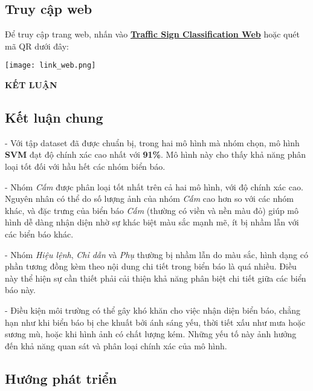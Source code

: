 \documentclass[a4paper,12pt]{article}
\begin{document}
\subsection{Truy cập web}
\hspace{5mm}Để truy cập trang web, nhấn vào \href{https://traffic-sign-classification-through-images.streamlit.app/}{\textbf{Traffic Sign Classification Web}} hoặc quét mã QR dưới đây:
\begin{center}
    \texttt{[image: link\_web.png]}
\end{center}

\newpage
{}
\thispagestyle{empty}
\begin{center}
    \textbf{\large KẾT LUẬN}
\end{center}
\vspace{1cm}
\subsection*{Kết luận chung}

\hspace{6mm}- Với tập dataset đã được chuẩn bị, trong hai mô hình mà nhóm chọn, mô hình \textbf{SVM} đạt độ chính xác cao nhất với \textbf{91\%}. Mô hình này cho thấy khả năng phân loại tốt đối với hầu hết các nhóm biển báo. 

- Nhóm \textit{Cấm} được phân loại tốt nhất trên cả hai mô hình, với độ chính xác cao. Nguyên nhân có thể do số lượng ảnh của nhóm \textit{Cấm} cao hơn so với các nhóm khác, và đặc trưng của biển báo \textit{Cấm} (thường có viền và nền màu đỏ) giúp mô hình dễ dàng nhận diện nhờ sự khác biệt màu sắc mạnh mẽ, ít bị nhầm lẫn với các biển báo khác.
  
- Nhóm \textit{Hiệu lệnh}, \textit{Chỉ dẫn} và \textit{Phụ} thường bị nhầm lẫn do màu sắc, hình dạng có phần tương đồng kèm theo nội dung chi tiết trong biển báo là quá nhiều. Điều này thể hiện sự cần thiết phải cải thiện khả năng phân biệt chi tiết giữa các biển báo này.

- Điều kiện môi trường có thể gây khó khăn cho việc nhận diện biển báo, chẳng hạn như khi biển báo bị che khuất bởi ánh sáng yếu, thời tiết xấu như mưa hoặc sương mù, hoặc khi hình ảnh có chất lượng kém. Những yếu tố này ảnh hưởng đến khả năng quan sát và phân loại chính xác của mô hình.

\subsection*{Hướng phát triển}
\end{document}

